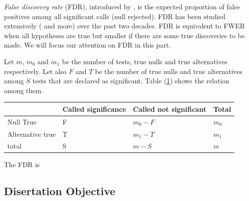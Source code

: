 \textit{False discovery rate} (FDR), introduced by \citet{benjamini1995controlling}, is the expected
proportion of false positives among all significant calls (null rejected). FDR has been studied
extensively (\cite{benjamini2001control,efron2004large,efron2010large,storey2003statistical} and
more) over the past two decades.  FDR is equivalent to FWER \citep{benjamini1995controlling} when
all hypotheses are true but smaller if there are some true discoveries to be made. We will focus
our
attention on FDR in this part. 

Let $m$,  $m_0$  and $m_1$ be the number of tests,  true nulls  and true alternatives respectively.
Let also $F$ and $T$ be the number of true nulls and true alternatives among $S$ tests that are
declared as significant. Table (\ref{table1}) shows the  relation among them. 
\begin{table}[h]\label{table1}\begin{center}
		\begin{tabular}{llll}
			& Called significance & Called not significant & Total  \\ \hline
			Null True &F &$m_0-F$  & $m_0$  \\
			Alternative true & T  & $m_1 -T$  & $m_1$  \\
			total & S & $m-S$  & $m$ \\ \hline
		\end{tabular}\end{center}
	\end{table} 
	The FDR is 
	
	\subsection{Disertation Objective}
	
	
	
	
